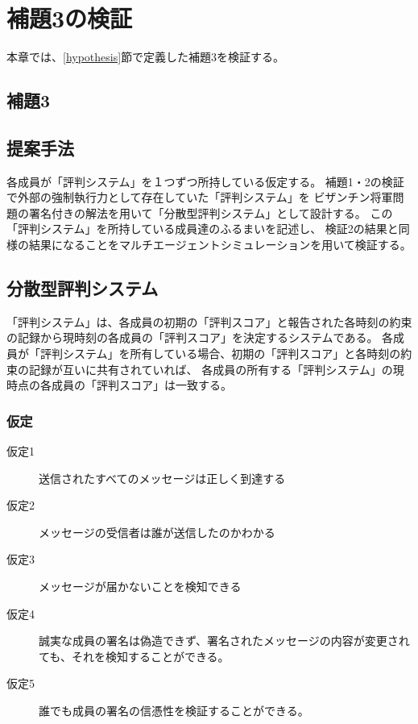 \chapter{補題3の検証}
本章では、\ref{hypothesis}節で定義した補題3を検証する。

\section{補題3}
\thirdLemma

\section{提案手法}
各成員が「評判システム」を１つずつ所持している仮定する。
補題1・2の検証で外部の強制執行力として存在していた「評判システム」を
ビザンチン将軍問題の署名付きの解法を用いて「分散型評判システム」として設計する。
この「評判システム」を所持している成員達のふるまいを記述し、
検証2の結果と同様の結果になることをマルチエージェントシミュレーションを用いて検証する。

\section{分散型評判システム}
「評判システム」は、各成員の初期の「評判スコア」と報告された各時刻の約束の記録から現時刻の各成員の「評判スコア」を決定するシステムである。
各成員が「評判システム」を所有している場合、初期の「評判スコア」と各時刻の約束の記録が互いに共有されていれば、
各成員の所有する「評判システム」の現時点の各成員の「評判スコア」は一致する。

\subsection{仮定}
\begin{description}
  \item[仮定1] 送信されたすべてのメッセージは正しく到達する
  \item[仮定2] メッセージの受信者は誰が送信したのかわかる
  \item[仮定3] メッセージが届かないことを検知できる
  \item[仮定4] 誠実な成員の署名は偽造できず、署名されたメッセージの内容が変更されても、それを検知することができる。
  \item[仮定5] 誰でも成員の署名の信憑性を検証することができる。
\end{description}

